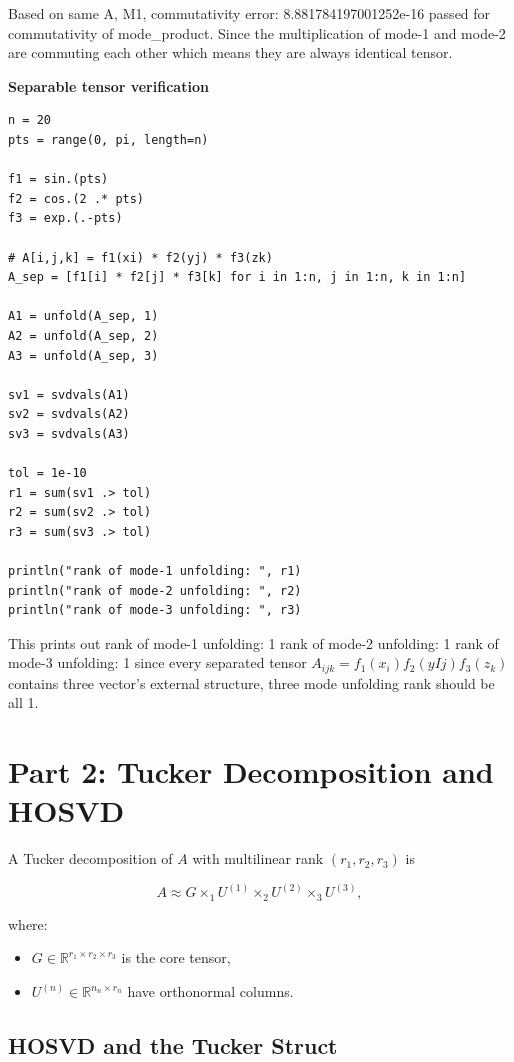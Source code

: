 \documentclass[11pt]{report}
\begin{document}
Based on same A, M1, commutativity error: 8.881784197001252e-16
passed for commutativity of mode\_product. Since the multiplication of mode-1 and mode-2 are commuting each other which means they are always identical tensor.

\textbf{Separable tensor verification}

\begin{lstlisting}
n = 20
pts = range(0, pi, length=n)

f1 = sin.(pts)
f2 = cos.(2 .* pts)
f3 = exp.(.-pts)

# A[i,j,k] = f1(xi) * f2(yj) * f3(zk)
A_sep = [f1[i] * f2[j] * f3[k] for i in 1:n, j in 1:n, k in 1:n]

A1 = unfold(A_sep, 1)
A2 = unfold(A_sep, 2)
A3 = unfold(A_sep, 3)

sv1 = svdvals(A1)
sv2 = svdvals(A2)
sv3 = svdvals(A3)

tol = 1e-10
r1 = sum(sv1 .> tol)
r2 = sum(sv2 .> tol)
r3 = sum(sv3 .> tol)

println("rank of mode-1 unfolding: ", r1)
println("rank of mode-2 unfolding: ", r2)
println("rank of mode-3 unfolding: ", r3)
\end{lstlisting}

This prints out rank of mode-1 unfolding: 1
rank of mode-2 unfolding: 1
rank of mode-3 unfolding: 1 since every separated tensor $A_{ijk} = f_1(x_i)f_2(yIj)f_3(z_k)$ contains three vector's external structure, three mode unfolding rank should be all 1. 


\section{Part 2: Tucker Decomposition and HOSVD}

A Tucker decomposition of \(A\) with multilinear rank \((r_1,r_2,r_3)\) is


\[
A \approx G \times_1 U^{(1)} \times_2 U^{(2)} \times_3 U^{(3)},
\]


where:
\begin{itemize}[leftmargin=*]
    \item \(G \in \mathbb{R}^{r_1 \times r_2 \times r_3}\) is the core tensor,
    \item \(U^{(n)} \in \mathbb{R}^{n_n \times r_n}\) have orthonormal columns.
\end{itemize}

\subsection{HOSVD and the Tucker Struct}
\end{document}
